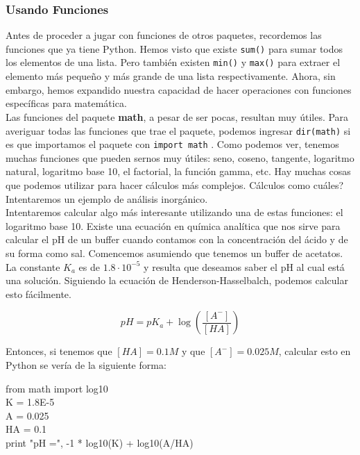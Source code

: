 \documentclass[10pt,letterpaper]{article}
\newcommand{\inlinecode}[1]{
\colorbox{light-gray}{\texttt{#1}}
}
\newenvironment{Code}
{
\begin{lrbox}{\selvestebox}%
\begin{minipage}{\dimexpr\columnwidth-2\fboxsep\relax}
\fontfamily{\ttdefault}\selectfont
}
{\end{minipage}\end{lrbox}%
\begin{center}
\colorbox{light-gray}{\usebox{\selvestebox}}
\end{center}
}
\begin{document}
\subsubsection{Usando Funciones}
Antes de proceder a jugar con funciones de otros paquetes, recordemos las funciones que ya tiene Python. Hemos visto que existe \inlinecode{sum()} para sumar todos los elementos de una lista. Pero tambi\'en existen \inlinecode{min()} y \inlinecode{max()} para extraer el elemento m\'as peque\~no y m\'as grande de una lista respectivamente. Ahora, sin embargo, hemos expandido nuestra capacidad de hacer operaciones con funciones espec\'ificas para matem\'atica.\\

Las funciones del paquete \textbf{math}, a pesar de ser pocas, resultan muy \'utiles. Para averiguar todas las funciones que trae el paquete, podemos ingresar \inlinecode{dir(math)} si es que importamos el paquete con \inlinecode{import math}. Como podemos ver, tenemos muchas funciones que pueden sernos muy \'utiles: seno, coseno, tangente, logaritmo natural, logaritmo base 10, el factorial, la funci\'on gamma, etc. Hay muchas cosas que podemos utilizar para hacer c\'alculos m\'as complejos. C\'alculos como cu\'ales? Intentaremos un ejemplo de an\'alisis inorg\'anico.\\

Intentaremos calcular algo m\'as interesante utilizando una de estas funciones: el logaritmo base 10. Existe una ecuaci\'on en qu\'imica anal\'itica que nos sirve para calcular el pH de un buffer cuando contamos con la concentraci\'on del \'acido y de su forma como sal. Comencemos asumiendo que tenemos un buffer de acetatos. La constante $K_a $ es de $ 1.8 \cdot 10^{-5}$ y resulta que deseamos saber el pH al cual est\'a una soluci\'on. Siguiendo la ecuaci\'on de Henderson-Hasselbalch, podemos calcular esto f\'acilmente.

\begin{equation}
pH = pK_a + \log \left( \frac{\left[A^-\right]}{\left[HA\right]} \right)
\end{equation}

Entonces, si tenemos que $\left[HA\right] = 0.1 M$ y que $\left[A^-\right] = 0.025 M$, calcular esto en Python se ver\'ia de la siguiente forma:

\begin{Code}
from math import log10\\
K = 1.8E-5\\
A = 0.025\\
HA = 0.1\\
print "pH =", -1 * log10(K) + log10(A/HA)
\end{Code}
\end{document}
